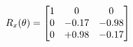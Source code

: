\documentclass[preview]{standalone}
\begin{document}
\begin{align*}
\special{dvisvgm:raw <g id='unique000'>}R_{x}(\theta) = \begin{bmatrix}1 & 0 & 0 \\0 & -0.17 & -0.98 \\0 & +0.98 & -0.17\end{bmatrix}\special{dvisvgm:raw </g>}
\end{align*}
\end{document}
